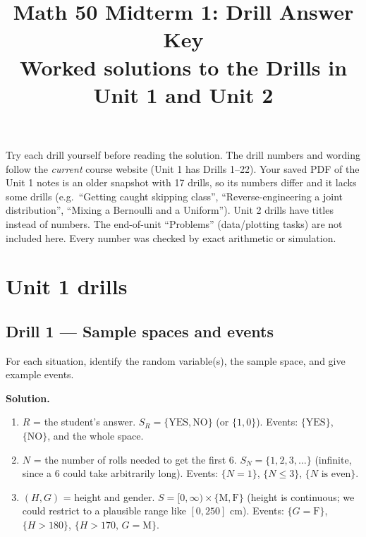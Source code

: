 \documentclass[11pt]{article}
\title{\textbf{Math 50 Midterm 1: Drill Answer Key}\\[2pt]\large Worked solutions to the Drills in Unit 1 and Unit 2}
\author{}
\date{}
\newenvironment{soln}{\par\smallskip\noindent\textbf{Solution.}\ }{\par\medskip}
\begin{document}
\maketitle
\thispagestyle{fancy}

\begin{tipbox}[title={Read this first}]
Try each drill yourself before reading the solution. The drill numbers and wording follow the \emph{current} course website
(Unit 1 has Drills 1--22). Your saved PDF of the Unit 1 notes is an older snapshot with 17 drills, so its numbers differ and it lacks some drills
(e.g.\ ``Getting caught skipping class'', ``Reverse-engineering a joint distribution'', ``Mixing a Bernoulli and a Uniform'').
Unit 2 drills have titles instead of numbers. The end-of-unit ``Problems'' (data/plotting tasks) are not included here.
Every number was checked by exact arithmetic or simulation.
\end{tipbox}

\section{Unit 1 drills}

\subsection*{Drill 1 --- Sample spaces and events}
For each situation, identify the random variable(s), the sample space, and give example events.
\begin{soln}
\begin{enumerate}[label=(\alph*),leftmargin=*,itemsep=2pt]
  \item $R$ = the student's answer. $S_R=\{\text{YES},\text{NO}\}$ (or $\{1,0\}$). Events: $\{\text{YES}\}$, $\{\text{NO}\}$, and the whole space.
  \item $N$ = the number of rolls needed to get the first $6$. $S_N=\{1,2,3,\dots\}$ (infinite, since a $6$ could take arbitrarily long). Events: $\{N=1\}$, $\{N\le3\}$, $\{N\text{ is even}\}$.
  \item $(H,G)$ = height and gender. $S=[0,\infty)\times\{\text{M},\text{F}\}$ (height is continuous; we could restrict to a plausible range like $[0,250]$ cm). Events: $\{G=\text{F}\}$, $\{H>180\}$, $\{H>170,\,G=\text{M}\}$.
\end{enumerate}
\end{soln}
\end{document}
